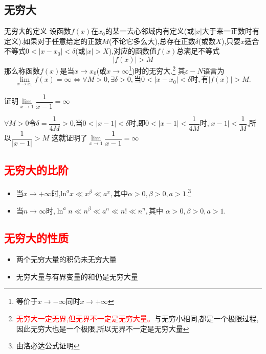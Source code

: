 \documentclass[9pt a4paper, oneside, UTF8]{ctexbook}
\begin{document}
\begin{sloppypar}
    \subsection{无穷大}
    \begin{defn}{无穷大的定义}{}
        设函数$f(x)$在$x_0$的某一去心邻域内有定义(或$|x|$大于来一正数时有定义).如果对于任意给定的正数$M$(不论它多么大),总存在正数$\delta$(或数$X$),只要$x$适合不等式$0<|x-x_0|<\delta$(或$|x|>X$),对应的函数值$f(x)$总满足不等式
        $$
            |f(x)|>M
        $$
        那么称函数$f(x)$是当$x\to x_0$(或$x\to\infty$\footnote{等价于$x \to -\infty$同时$x \to +\infty$})时的无穷大.\footnote{\textcolor{red}{无穷大一定无界,但无界不一定是无穷大量。}与无穷小相同,都是一个极限过程,因此无穷大也是一个极限,所以无界不一定是无穷大量}
        其$\varepsilon-N$语言为
        $$
            \lim\limits_{x\to x_0}f(x)= \infty \Leftrightarrow\forall M >0,\exists\delta>0,\text{当}0<|x-x_0|<\delta\text{时},\text{有}|f(x)|>M.
        $$
    \end{defn}
    \begin{problem}
    证明$\underset{x\rightarrow1}{\operatorname*{lim}}\dfrac{1}{x-1}=\infty $
    \end{problem}
    \begin{solution}
        $\forall M>0$令$\delta=\dfrac{1}{4M}>0$,当$0<|x-1|<\delta$时,即$0<|x-1|<\dfrac{1}{4M}$时,$|x-1|<\dfrac{1}{M}$,所以$\dfrac{1}{|x-1|}>M$
        这就证明了$\underset{x\rightarrow1}{\operatorname*{lim}}\dfrac{1}{x-1}=\infty$
    \end{solution}
    \subsection{\textcolor{red}{无穷大的比阶}}
    \begin{itemize}
        \item 当$x \to +\infty$时,$\mathrm{ln}^ax\ll x^\beta\ll a^x,\text{其中}\alpha>0,\beta>0,a>1.$\footnote{由洛必达公式证明}
        \item 当$n \to \infty$时,$\ln^an\ll n^\beta\ll a^n\ll n!\ll n^n,\text{其中 }\alpha>0,\beta>0,a>1.$
    \end{itemize}
    \subsection{\textcolor{red}{无穷大的性质}}
    \begin{itemize}
        \item 两个无穷大量的积仍未无穷大量
        \item 无穷大量与有界变量的和仍是无穷大量
    \end{itemize}

\end{sloppypar}
\end{document}
